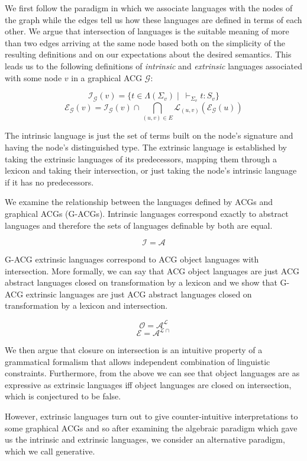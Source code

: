 \documentclass[twocolumn]{article}
\begin{document}
We first follow the paradigm in which we associate languages with the
nodes of the graph while the edges tell us how these languages are
defined in terms of each other. We argue that intersection of languages
is the suitable meaning of more than two edges arriving at the same node
based both on the simplicity of the resulting definitions and on our
expectations about the desired semantics. This leads us to the following
definitions of \emph{intrinsic} and \emph{extrinsic} languages
associated with some node $v$ in a graphical ACG $\mathcal{G}$:

$$
\mathcal{I}_{\mathcal{G}}(v) = \{t \in \Lambda(\Sigma_v)
\mid\ \vdash_{\Sigma_v} t : S_v\}
$$
$$
\mathcal{E}_{\mathcal{G}}(v) = \mathcal{I}_{\mathcal{G}}(v) \cap
\bigcap_{(u,v) \in E} \mathcal{L}_{(u,v)}(\mathcal{E}_{\mathcal{G}}(u))
$$

The intrinsic language is just the set of terms built on the node's
signature and having the node's distinguished type. The extrinsic
language is established by taking the extrinsic languages of its
predecessors, mapping them through a lexicon and taking their
intersection, or just taking the node's intrinsic language if it has no
predecessors.

We examine the relationship between the languages defined by ACGs and
graphical ACGs (G-ACGs). Intrinsic languages correspond exactly to
abstract languages and therefore the sets of languages definable by both
are equal.

$$
\mathcal{I} = \mathcal{A}
$$

G-ACG extrinsic languages correspond to ACG object languages with
intersection. More formally, we can say that ACG object languages are
just ACG abstract languages closed on transformation by a lexicon and we
show that G-ACG extrinsic languages are just ACG abstract languages
closed on transformation by a lexicon and intersection.

$$
\mathcal{O} = \mathcal{A}^{\mathcal{L}}
$$
$$
\mathcal{E} = \mathcal{A}^{\mathcal{L}{\cap}}
$$

We then argue that closure on intersection is an intuitive property of a
grammatical formalism that allows independent combination of linguistic
constraints. Furthermore, from the above we can see that object
languages are as expressive as extrinsic languages iff object languages
are closed on intersection, which is conjectured to be false.

However, extrinsic languages turn out to give counter-intuitive
interpretations to some graphical ACGs and so after examining the
algebraic paradigm which gave us the intrinsic and extrinsic languages,
we consider an alternative paradigm, which we call generative.
\end{document}
